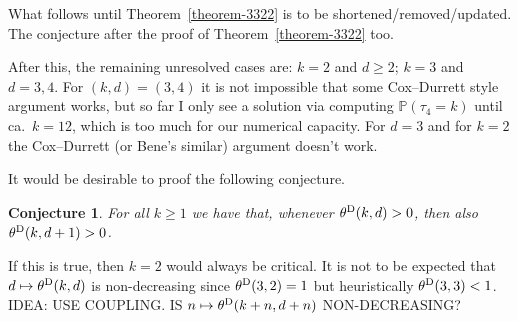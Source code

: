 \documentclass{article}
\newtheorem{conj}[theorem]{Conjecture}
\theoremstyle{definition}
\renewcommand{\P}{\mathbb{P}}
\newcommand{\1}{\mathbbm{1}}
\newcommand{\0}{\mathbf{o}}
\begin{document}
\color{red} What follows until Theorem~\ref{theorem-3322} is to be shortened/removed/updated. The conjecture after the proof of Theorem~\ref{theorem-3322} too. \color{black}

\color{green} After this, the remaining unresolved cases are: $k=2$ and $d \geq 2$; $k=3$ and $d=3,4$. For $(k,d)=(3,4)$ it is not impossible that some Cox--Durrett style argument works, but so far I only see a solution via computing $\P(\tau_4=k)$ until ca.\ $k=12$, which is too much for our numerical capacity. For $d=3$ and for $k=2$ the Cox--Durrett (or Bene's similar) argument doesn't work. \color{black}


\bigskip
It would be desirable to proof the following conjecture.
\begin{conj}
For all $k\ge 1$ we have that, whenever $\theta^{\rm D}(k,d)>0$, then also $\theta^{\rm D}(k,d+1)>0$. 
\end{conj}
If this is true, then $k=2$ would always be critical. It is not to be expected that $d\mapsto\theta^{\rm D}(k,d)$ is non-decreasing since $\theta^{\rm D}(3,2)=1$ but heuristically $\theta^{\rm D}(3,3)<1$. IDEA: USE COUPLING. IS $n\mapsto \theta^{\rm D}(k+n,d+n)$ NON-DECREASING? 
\end{document}
